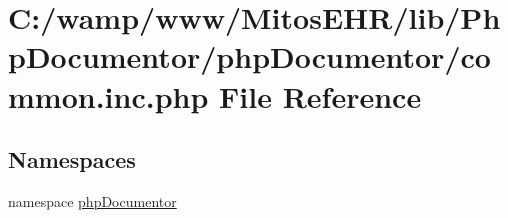 \hypertarget{common_8inc_8php}{\section{\-C\-:/wamp/www/\-Mitos\-E\-H\-R/lib/\-Php\-Documentor/php\-Documentor/common.inc.\-php \-File \-Reference}
\label{common_8inc_8php}
}
\subsection*{\-Namespaces}
\begin{DoxyCompactItemize}
\item 
namespace \hyperlink{namespacephp_documentor}{php\-Documentor}
\end{DoxyCompactItemize}
